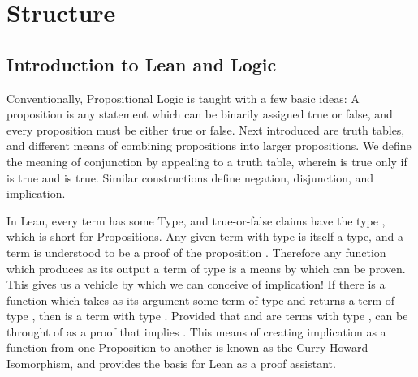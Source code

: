 

\chapter{Structure}

\section{Introduction to Lean and Logic}

Conventionally, Propositional Logic is taught with a few basic ideas:
A proposition is any statement which can be binarily assigned true or 
false, and every proposition must be either true or false. Next introduced 
are truth tables, and different means of combining propositions into 
larger propositions. We define the meaning of conjunction by appealing to 
a truth table, wherein  is true only if  is true 
and  is true.
Similar constructions define negation, disjunction, and implication. 

In Lean, every term has some Type, and true-or-false claims have the type 
, which is short for Propositions. Any given term  with
type  is itself a type, and a term  is understood to be a 
proof of the proposition . Therefore any function which produces as its
output a term of type  is a means by which  can be proven. This gives 
us a vehicle by which we can conceive of implication! If there is a function
 which takes as its argument some term  of type  and returns
a term of type , then  is a term with type . Provided that 
 and  are terms with type ,  can be throught of as a proof
that  implies . This means of creating implication as a function from
one Proposition to another is known as the Curry-Howard Isomorphism, and
provides the basis for Lean as a proof assistant. 

